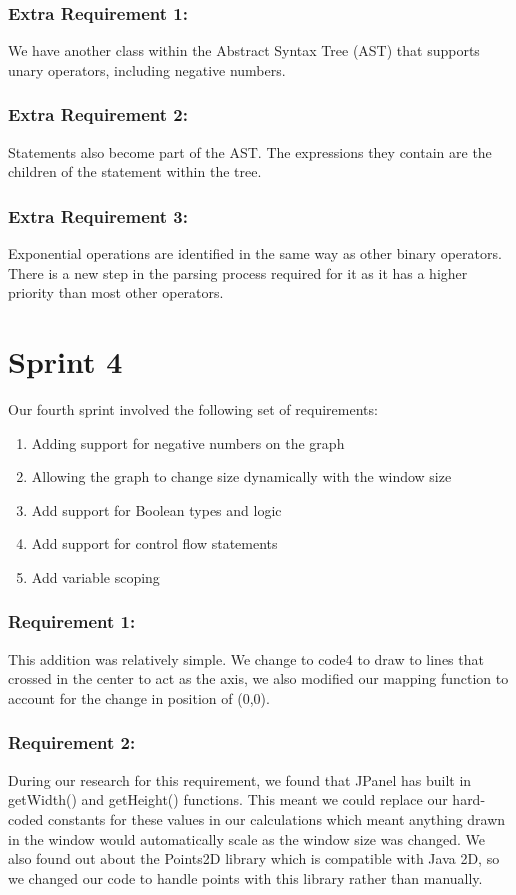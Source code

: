 \documentclass[a4paper, oneside, 11pt]{report}
\begin{document}
\subsubsection {Extra Requirement 1: }

We have another class within the Abstract Syntax Tree (AST) that supports unary operators, including negative numbers.

\subsubsection {Extra Requirement 2: }

Statements also become part of the AST. The expressions they contain are the children of the statement within the tree.

\subsubsection { Extra Requirement 3: }

Exponential operations are identified in the same way as other binary operators. There is a new step in the parsing process required for it as it has a higher priority than most other operators.


\section{Sprint 4}
Our fourth sprint involved the following set of requirements:
\begin{enumerate}
\item Adding support for negative numbers on the graph
\item Allowing the graph to change size dynamically with the window size
\item Add support for Boolean types and logic
\item Add support for control flow statements
\item Add variable scoping
\end{enumerate}

\subsubsection{Requirement 1: }
This addition was relatively simple. We change to code4 to draw to lines that crossed in the center to act as the axis, we also modified our mapping function to account for  the change in position of (0,0).
\subsubsection{Requirement 2: }
During our research for this requirement, we found that JPanel has built in getWidth() and getHeight() functions. This meant we could replace our hard-coded constants for these values in our calculations which meant anything drawn in the window would automatically scale as the window size was changed.
We also found out about the Points2D library which is compatible with Java 2D, so we changed our code to handle points with this library rather than manually.
\end{document}
